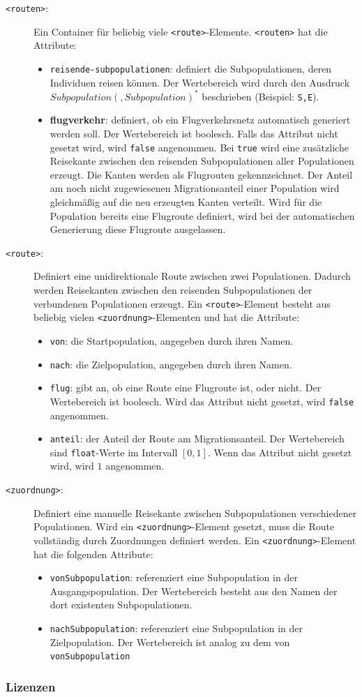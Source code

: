 \begin{description}
\begin{itemize}
\end{itemize}
\item[\texttt{<routen>}:] Ein Container für beliebig viele \texttt{<route>}-Elemente. \texttt{<routen>} hat die Attribute:
\begin{itemize}
	\item \texttt{reisende-subpopulationen}: definiert die Subpopulationen, deren Individuen reisen können. Der Wertebereich wird durch den Ausdruck $Subpopulation(,Subpopulation)^*$ beschrieben (Beispiel: \texttt{S,E}). 
	\item \textbf{flugverkehr}: definiert, ob ein Flugverkehrsnetz automatisch generiert werden soll. Der Wertebereich ist boolesch. Falls das Attribut nicht gesetzt wird, wird \texttt{false} angenommen. Bei \texttt{true} wird eine zusätzliche Reisekante zwischen den reisenden Subpopulationen aller Populationen erzeugt. Die Kanten werden als Flugrouten gekennzeichnet. Der Anteil am noch nicht zugewiesenen Migrationsanteil einer Population wird gleichmäßig auf die neu erzeugten Kanten verteilt. Wird für die Population bereits eine Flugroute definiert, wird bei der automatischen Generierung diese Flugroute ausgelassen. 
\end{itemize}
\item[\texttt{<route>}:] Definiert eine unidirektionale Route zwischen zwei Populationen. Dadurch werden Reisekanten zwischen den reisenden Subpopulationen der verbundenen Populationen erzeugt. Ein \texttt{<route>}-Element besteht aus beliebig vielen \texttt{<zuordnung>}-Elementen und hat die Attribute:\begin{itemize}
	\item \texttt{von}: die Startpopulation, angegeben durch ihren Namen.
	\item \texttt{nach}: die Zielpopulation, angegeben durch ihren Namen.
	\item \texttt{flug}: gibt an, ob eine Route eine Flugroute ist, oder nicht. Der Wertebereich ist boolesch. Wird das Attribut nicht gesetzt, wird \texttt{false} angenommen.
	\item \texttt{anteil}: der Anteil der Route am Migrationsanteil. Der Wertebereich sind \texttt{float}-Werte im Intervall $[0,1]$. Wenn das Attribut nicht gesetzt wird, wird $1$ angenommen.
\end{itemize}
\item[\texttt{<zuordnung>}:] Definiert eine manuelle Reisekante zwischen Subpopulationen verschiedener Populationen. Wird ein \texttt{<zuordnung>}-Element gesetzt, muss die Route vollständig durch Zuordnungen definiert werden. Ein \texttt{<zuordnung>}-Element hat die folgenden Attribute:\begin{itemize}
	\item \texttt{vonSubpopulation}: referenziert eine Subpopulation in der Ausgangspopulation. Der Wertebereich besteht aus den Namen der dort existenten Subpopulationen. 
	\item \texttt{nachSubpopulation}: referenziert eine Subpopulation in der Zielpopulation. Der Wertebereich ist analog zu dem von \texttt{vonSubpopulation}
\end{itemize} 
\end{description}

\subsubsection*{Lizenzen}